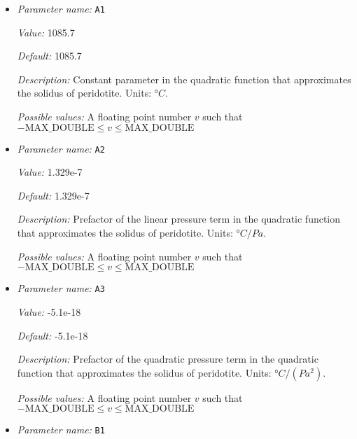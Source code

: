 \begin{itemize}
\item {\it Parameter name:} {\tt A1}
\label{parameters:Postprocess/Visualization/Melt fraction/A1}
\label{parameters:Postprocess/Visualization/Melt_20fraction/A1}


{\it Value:} 1085.7


{\it Default:} 1085.7


{\it Description:} Constant parameter in the quadratic function that approximates the solidus of peridotite. Units: $°C$.


{\it Possible values:} A floating point number $v$ such that $-\text{MAX\_DOUBLE} \leq v \leq \text{MAX\_DOUBLE}$
\item {\it Parameter name:} {\tt A2}
\label{parameters:Postprocess/Visualization/Melt fraction/A2}
\label{parameters:Postprocess/Visualization/Melt_20fraction/A2}


{\it Value:} 1.329e-7


{\it Default:} 1.329e-7


{\it Description:} Prefactor of the linear pressure term in the quadratic function that approximates the solidus of peridotite. Units: $°C/Pa$.


{\it Possible values:} A floating point number $v$ such that $-\text{MAX\_DOUBLE} \leq v \leq \text{MAX\_DOUBLE}$
\item {\it Parameter name:} {\tt A3}
\label{parameters:Postprocess/Visualization/Melt fraction/A3}
\label{parameters:Postprocess/Visualization/Melt_20fraction/A3}


{\it Value:} -5.1e-18


{\it Default:} -5.1e-18


{\it Description:} Prefactor of the quadratic pressure term in the quadratic function that approximates the solidus of peridotite. Units: $°C/(Pa^2)$.


{\it Possible values:} A floating point number $v$ such that $-\text{MAX\_DOUBLE} \leq v \leq \text{MAX\_DOUBLE}$
\item {\it Parameter name:} {\tt B1}
\label{parameters:Postprocess/Visualization/Melt fraction/B1}
\label{parameters:Postprocess/Visualization/Melt_20fraction/B1}



\end{itemize}
